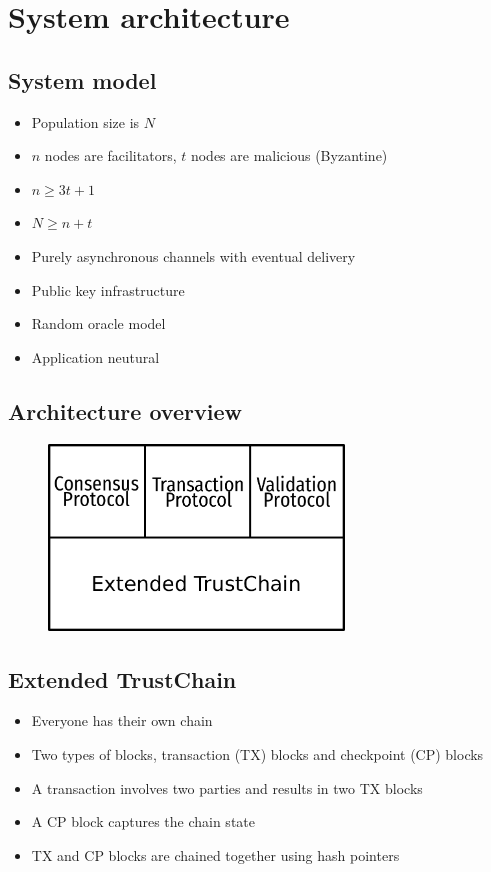 \documentclass{beamer}
\begin{document}
\section{System architecture}
\subsection{System model}
\begin{frame}{\subsecname}
  \begin{itemize}
    \item Population size is $N$
    \item $n$ nodes are facilitators, $t$ nodes are malicious (Byzantine)
    \item $n \ge 3t + 1$
    \item $N \ge n + t$
    \item Purely asynchronous channels with eventual delivery
    \item Public key infrastructure
    \item Random oracle model
    \item Application neutural
  \end{itemize}
\end{frame}

\subsection{Architecture overview}
\begin{frame}{\subsecname}
  \begin{figure}[h]
  \includegraphics[width=0.7\textwidth]{architecture}
  \centering
  \end{figure}
\end{frame}

\subsection{Extended TrustChain}
\begin{frame}{\subsecname}
  \begin{itemize}
    \item Everyone has their own chain
    \item Two types of blocks, transaction (TX) blocks and checkpoint (CP) blocks
    \item A transaction involves two parties and results in two TX blocks
    \item A CP block captures the chain state
    \item TX and CP blocks are chained together using hash pointers
  \end{itemize}
\end{frame}
\end{document}
